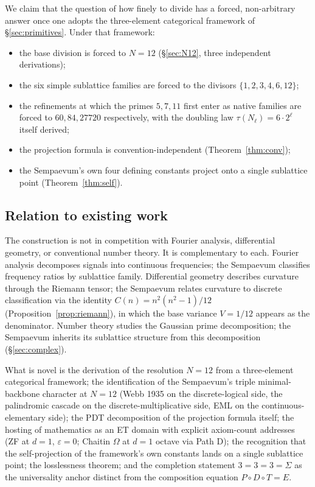 \documentclass[11pt,a4paper]{article}
\theoremstyle{definition}
\theoremstyle{remark}
\begin{document}
We claim that the question of how finely to divide has a forced, non-arbitrary answer once one adopts the three-element categorical framework of \S\ref{sec:primitives}. Under that framework:
\begin{itemize}[leftmargin=*]
\item the base division is forced to $N=12$ (\S\ref{sec:N12}, three independent derivations);
\item the six simple sublattice families are forced to the divisors $\{1,2,3,4,6,12\}$;
\item the refinements at which the primes $5,7,11$ first enter as native families are forced to $60,84,27720$ respectively, with the doubling law $\tau(N_{\ell}) = 6\cdot 2^{\ell}$ itself derived;
\item the projection formula is convention-independent (Theorem~\ref{thm:conv});
\item the Sempaevum's own four defining constants project onto a single sublattice point (Theorem~\ref{thm:self}).
\end{itemize}

\subsection{Relation to existing work}

The construction is not in competition with Fourier analysis, differential geometry, or conventional number theory. It is complementary to each. Fourier analysis decomposes signals into continuous frequencies; the Sempaevum classifies frequency ratios by sublattice family. Differential geometry describes curvature through the Riemann tensor; the Sempaevum relates curvature to discrete classification via the identity $C(n) = n^{2}(n^{2}-1)/12$ (Proposition~\ref{prop:riemann}), in which the base variance $V=1/12$ appears as the denominator. Number theory studies the Gaussian prime decomposition; the Sempaevum inherits its sublattice structure from this decomposition (\S\ref{sec:complex}).

What is novel is the derivation of the resolution $N=12$ from a three-element categorical framework; the identification of the Sempaevum's triple minimal-backbone character at $N=12$ (Webb 1935 on the discrete-logical side, the palindromic cascade on the discrete-multiplicative side, EML on the continuous-elementary side); the PDT decomposition of the projection formula itself; the hosting of mathematics as an ET domain with explicit axiom-count addresses (ZF at $d=1$, $\varepsilon=0$; Chaitin $\Omega$ at $d=1$ octave via Path D); the recognition that the self-projection of the framework's own constants lands on a single sublattice point; the losslessness theorem; and the completion statement $3=3=3=\Sigma$ as the universality anchor distinct from the composition equation $P\circ D\circ T = E$.
\end{document}
